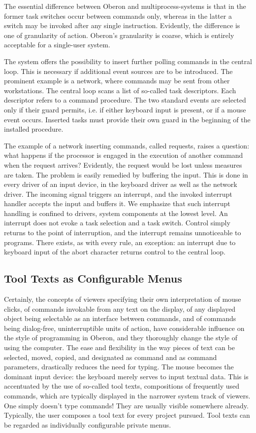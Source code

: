 The essential difference between Oberon and multiprocess-systems is that in the former task
switches occur between commands only, whereas in the latter a switch may be invoked after any
single instruction. Evidently, the difference is one of granularity of action. Oberon's granularity is
coarse, which is entirely acceptable for a single-user system.

The system offers the possibility to insert further polling commands in the central loop. This is
necessary if additional event sources are to be introduced. The prominent example is a network,
where commands may be sent from other workstations. The central loop scans a list of so-called
task descriptors. Each descriptor refers to a command procedure. The two standard events are
selected only if their guard permits, i.e. if either keyboard input is present, or if a mouse event
occurs. Inserted tasks must provide their own guard in the beginning of the installed procedure.

The example of a network inserting commands, called requests, raises a question: what happens if
the processor is engaged in the execution of another command when the request arrives?
Evidently, the request would be lost unless measures are taken. The problem is easily remedied by
buffering the input. This is done in every driver of an input device, in the keyboard driver as well as
the network driver. The incoming signal triggers an interrupt, and the invoked interrupt handler
accepts the input and buffers it. We emphasize that such interrupt handling is confined to drivers,
system components at the lowest level. An interrupt does not evoke a task selection and a task
switch. Control simply returns to the point of interruption, and the interrupt remains unnoticeable to
programs. There exists, as with every rule, an exception: an interrupt due to keyboard input of the
abort character returns control to the central loop.

\subsection{Tool Texts as Configurable Menus}
Certainly, the concepts of viewers specifying their own interpretation of mouse clicks, of commands
invokable from any text on the display, of any displayed object being selectable as an interface
between commands, and of commands being dialog-free, uninterruptible units of action, have
considerable influence on the style of programming in Oberon, and they thoroughly change the
style of using the computer. The ease and flexibility in the way pieces of text can be selected,
moved, copied, and designated as command and as command parameters, drastically reduces the
need for typing. The mouse becomes the dominant input device: the keyboard merely serves to
input textual data. This is accentuated by the use of so-called tool texts, compositions of frequently
used commands, which are typically displayed in the narrower system track of viewers. One simply
doesn't type commands! They are usually visible somewhere already. Typically, the user composes
a tool text for every project pursued. Tool texts can be regarded as individually configurable private menus.

